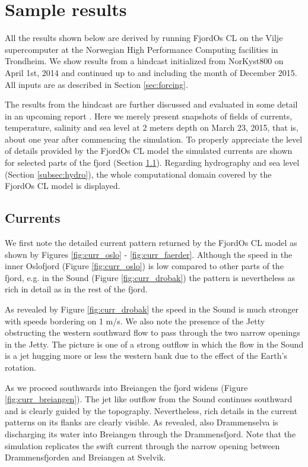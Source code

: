 \section{Sample results}
\label{sec:resul}
All the results shown below are derived by running FjordOs CL on the Vilje supercomputer at the Norwegian High Performance Computing facilities in Trondheim. We show results from a hindcast initialized from NorKyst800 on April 1st, 2014 and continued up to and including the month of December 2015. All inputs are as described in Section \ref{sec:forcing}.
 
The results from the hindcast are further discussed and evaluated in some detail in an upcoming report \citep{hjelm:etal:2016}. Here we merely present snapshots of fields of currents, temperature, salinity and sea level at 2 meters depth on March 23, 2015, that is, about one year after commencing the simulation. To properly appreciate the level of details provided by the FjordOs CL model the simulated currents are shown for selected parts of the fjord (Section \ref{subsec:curre}). Regarding hydrography and sea level (Section \ref{subsec:hydro}), the whole computational domain covered by the FjordOs CL model is displayed.

\subsection{Currents}
\label{subsec:curre}
We first note the detailed current pattern returned by the FjordOs CL model as shown by Figures \ref{fig:curr_oslo} - \ref{fig:curr_faerder}. Although the speed in the inner Oslofjord (Figure \ref{fig:curr_oslo}) is low compared to other parts of the fjord, e.g. in the {\DR} Sound (Figure \ref{fig:curr_drobak}) the pattern is nevertheless as rich in detail as in the rest of the fjord. 
 
 
   

As revealed by Figure \ref{fig:curr_drobak} the speed in the {\DR} Sound is much stronger with speeds bordering on 1 m/s. We also note the presence of the Jetty obstructing the western southward flow to pass through the two narrow openings in the Jetty. The picture is one of a strong outflow in which the flow in the {\DR} Sound is a jet hugging more or less the western bank due to the effect of the Earth's rotation.   

As we proceed southwards into Breiangen the fjord widens (Figure \ref{fig:curr_breiangen}). The jet like outflow from the {\DR} Sound continues southward and is clearly guided by the topography. Nevertheless, rich details in the current patterns on its flanks  are clearly visible. As revealed, also Drammenselva is discharging its water into Breiangen through the Drammensfjord. Note that the simulation replicates the swift current through the narrow opening between Drammensfjorden and Breiangen at Svelvik.  
% 
 

